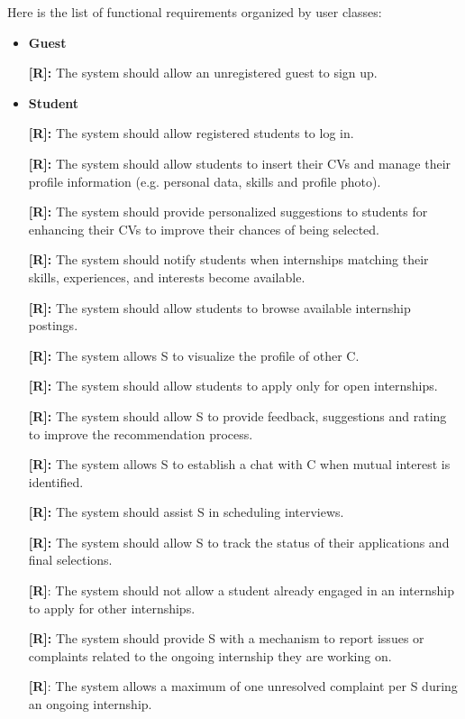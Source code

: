 Here is the list of functional requirements organized by user classes:
\setcounter{r}{1}
\newcommand{\creq}{\ther{}}

\begin{itemize}
\item
    \textbf{Guest}

\textbf{[R\creq]:} The system should allow an unregistered guest to sign up.

\item 
    \textbf{Student}

\textbf{[R\creq]:} The system should allow registered students to log in.

\textbf{[R\creq]:} The system should allow students to insert their CVs and
manage their profile information (e.g. personal data, skills and profile
photo).

\textbf{[R\creq]:} The system should provide personalized suggestions to students for enhancing their CVs to improve their chances of being selected.

\textbf{[R\creq]:} The system should notify students when internships matching
their skills, experiences, and interests become available.

\textbf{[R\creq]:} The system should allow students to browse available
internship postings.

\textbf{[R\creq]:} The system allows S to visualize the profile of other C.

\textbf{[R\creq]:} The system should allow students to apply only for open internships.

\textbf{[R\creq]:} The system should allow S to provide feedback, suggestions and rating to improve the recommendation process.

\textbf{[R\creq]:} The system allows S to establish a chat with C when mutual
interest is identified.

\textbf{[R\creq]:} The system should assist S in scheduling interviews.

\textbf{[R\creq]:} The system should allow S to track the status of their
applications and final selections.

{\textbf{[R\creq]}}: The system should not allow a student already engaged in an internship to apply for other internships.

\textbf{[R\creq]:} The system should provide S with a mechanism to report issues or complaints related to the ongoing internship they are working on.

\textbf{[R\creq]}: The system allows a maximum of one unresolved complaint per S during an ongoing internship.


\end{itemize}

